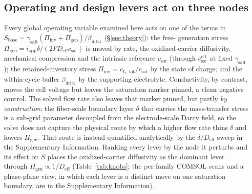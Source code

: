 \documentclass[11pt]{article}
\newcommand{\csat}{c_{\mathrm{sat}}}
\newcommand{\iapp}{i_{\mathrm{app}}}
\newcommand{\Deff}{D_{\mathrm{eff}}}
\begin{document}
\subsection{Operating and design levers act on three nodes}
\label{sec:knob-mechanism}
Every global operating variable examined here acts on one of the terms in
$S_{\mathrm{base}}=\gamma_{\mathrm{salt}}(\Pi_{\mathrm{inv}}+\Pi_{\mathrm{gen}})/\beta_{\mathrm{intra}}$
(\S\ref{sec:theory}): the
free- generation stress $\Pi_{\mathrm{gen}}=\iapp\delta/(2F\Deff\csat)$ is moved by rate, the
oxidized-carrier diffusivity, mechanical compression and the intrinsic reference $\csat$ (through
$\csat^{\mathrm{eff}}$ at fixed $\gamma_{\mathrm{salt}}$); the
retained-inventory stress $\Pi_{\mathrm{inv}}=c_{\mathrm{I_2,tot}}/\csat$ by the state of charge; and the
within-cycle buffer $\beta_{\mathrm{intra}}$ by the supporting electrolyte. Conductivity, by contrast, moves
the cell voltage but leaves the saturation marker pinned, a clean negative control. The solved
flow rate also leaves that marker pinned, but partly \emph{by construction}: the fiber-scale boundary layer
$\delta$ that carries the mass-transfer stress is a sub-grid parameter decoupled from the electrode-scale
Darcy field, so the solve does not capture the physical route by which a higher flow rate thins $\delta$ and
lowers $\Pi_{\mathrm{gen}}$. That route is instead quantified analytically by the $\delta/\Deff$ sweep in the
Supplementary Information. Ranking every lever
by the node it perturbs and its effect on $S$ places the oxidized-carrier diffusivity as the dominant lever
through $\Pi_{\mathrm{gen}}\propto1/\Deff$ (Table~\ref{tab:knobs}; the per-family COMSOL scans and a
phase-plane view, in which each lever is a distinct move on one saturation boundary, are in the Supplementary
Information).
\end{document}
